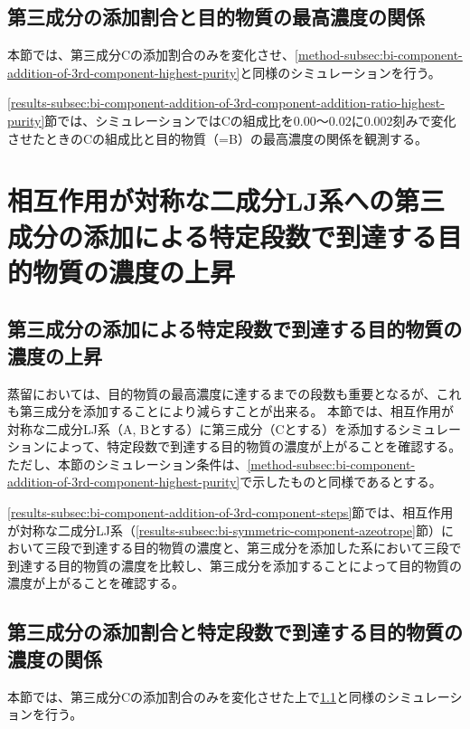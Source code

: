 \documentclass[titlepage]{jsreport}
\begin{document}
\subsection{第三成分の添加割合と目的物質の最高濃度の関係} \label{method-subsec:bi-component-addition-of-3rd-component-addition-ratio-highest-purity}
本節では、第三成分Cの添加割合のみを変化させ、\ref{method-subsec:bi-component-addition-of-3rd-component-highest-purity}と同様のシミュレーションを行う。

\ref{results-subsec:bi-component-addition-of-3rd-component-addition-ratio-highest-purity}節では、シミュレーションではCの組成比を$0.00〜0.02$に$0.002$刻みで変化させたときのCの組成比と目的物質（=B）の最高濃度の関係を観測する。


\section{相互作用が対称な二成分LJ系への第三成分の添加による特定段数で到達する目的物質の濃度の上昇} \label{method-sec:bi-component-addition-of-3rd-component-steps}
\subsection{第三成分の添加による特定段数で到達する目的物質の濃度の上昇} \label{method-subsec:bi-component-addition-of-3rd-component-steps}
蒸留においては、目的物質の最高濃度に達するまでの段数も重要となるが、これも第三成分を添加することにより減らすことが出来る\cite{distillation}。
本節では、相互作用が対称な二成分LJ系（A, Bとする）に第三成分（Cとする）を添加するシミュレーションによって、特定段数で到達する目的物質の濃度が上がることを確認する。
ただし、本節のシミュレーション条件は、\ref{method-subsec:bi-component-addition-of-3rd-component-highest-purity}で示したものと同様であるとする。

\ref{results-subsec:bi-component-addition-of-3rd-component-steps}節では、相互作用が対称な二成分LJ系（\ref{results-subsec:bi-symmetric-component-azeotrope}節）において三段で到達する目的物質の濃度と、第三成分を添加した系において三段で到達する目的物質の濃度を比較し、第三成分を添加することによって目的物質の濃度が上がることを確認する。


\subsection{第三成分の添加割合と特定段数で到達する目的物質の濃度の関係} \label{method-subsec:bi-component-addition-of-3rd-component-addition-ratio-steps}
本節では、第三成分Cの添加割合のみを変化させた上で\ref{method-subsec:bi-component-addition-of-3rd-component-steps}と同様のシミュレーションを行う。
\end{document}
